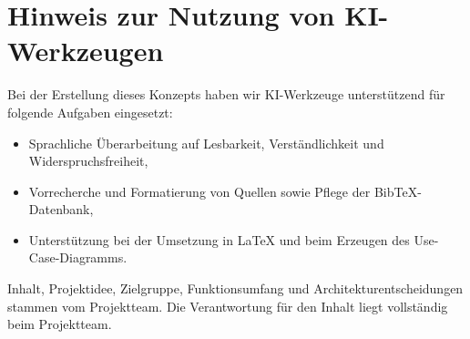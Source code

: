 \section*{Hinweis zur Nutzung von KI-Werkzeugen}

Bei der Erstellung dieses Konzepts haben wir KI-Werkzeuge unterstützend für folgende Aufgaben eingesetzt:

\begin{itemize}
	\item Sprachliche Überarbeitung auf Lesbarkeit, Verständlichkeit und Widerspruchsfreiheit,
	\item Vorrecherche und Formatierung von Quellen sowie Pflege der BibTeX-Datenbank,
	\item Unterstützung bei der Umsetzung in LaTeX und beim Erzeugen des Use-Case-Diagramms.
\end{itemize}

Inhalt, Projektidee, Zielgruppe, Funktionsumfang und Architekturentscheidungen stammen vom Projektteam. Die Verantwortung für den Inhalt liegt vollständig beim Projektteam.